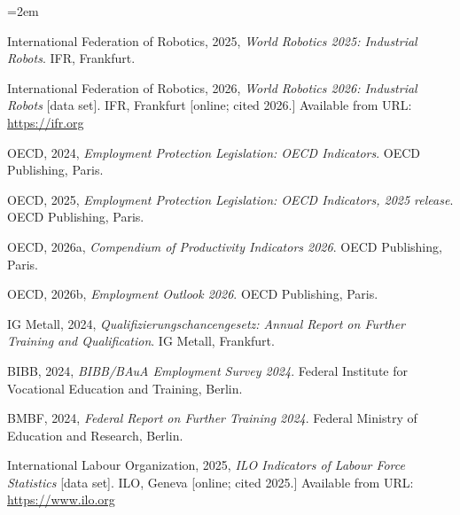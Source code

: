 \documentclass[12pt]{article}
\begin{document}
\begin{list}{}{\leftmargin=2em}
\item International Federation of Robotics, 2025, \emph{World Robotics 2025: Industrial Robots}. IFR, Frankfurt.
\item International Federation of Robotics, 2026, \emph{World Robotics 2026: Industrial Robots} [data set]. IFR, Frankfurt [online; cited 2026.] Available from URL: \url{https://ifr.org}
\item OECD, 2024, \emph{Employment Protection Legislation: OECD Indicators}. OECD Publishing, Paris.
\item OECD, 2025, \emph{Employment Protection Legislation: OECD Indicators, 2025 release}. OECD Publishing, Paris.
\item OECD, 2026a, \emph{Compendium of Productivity Indicators 2026}. OECD Publishing, Paris.
\item OECD, 2026b, \emph{Employment Outlook 2026}. OECD Publishing, Paris.
\item IG Metall, 2024, \emph{Qualifizierungschancengesetz: Annual Report on Further Training and Qualification}. IG Metall, Frankfurt.
\item BIBB, 2024, \emph{BIBB/BAuA Employment Survey 2024}. Federal Institute for Vocational Education and Training, Berlin.
\item BMBF, 2024, \emph{Federal Report on Further Training 2024}. Federal Ministry of Education and Research, Berlin.
\item International Labour Organization, 2025, \emph{ILO Indicators of Labour Force Statistics} [data set]. ILO, Geneva [online; cited 2025.] Available from URL: \url{https://www.ilo.org}
\end{list}

\newpage
\end{document}
